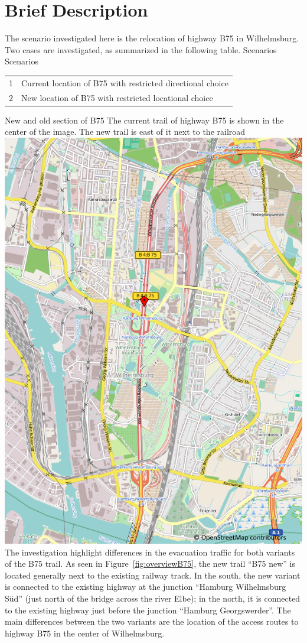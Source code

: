 \section{Brief Description}
The scenario investigated here is the relocation of highway B75 in Wilhelmsburg. Two cases are investigated, as summarized in the following table.
%
\createtable%
	{Scenarios}%
	{Scenarios}%
	{\label{table:b75scenarios}}%
	{%
	\begin{tabular}{|l | l|}
	\hline
	1 & Current location of B75 with restricted directional choice\\
	2 & New location of B75 with restricted locational choice\\
	\hline
\end{tabular}
}%
{}%
%
\createfigure%
	{New and old section of B75}%
	{The current trail of highway B75 is shown in the center of the image. The new trail is east of it next to the railroad}%
	{\label{fig:overviewB75}}%
	{\includegraphics[width=0.7\linewidth]{scenarios/figures/B75overview}}%
{}
%
The investigation highlight differences in the evacuation traffic for both variants of the B75 trail. As seen in Figure~\ref{fig:overviewB75}, the new trail ``B75 new'' is located generally next to the existing railway track. In the south, the new variant is connected to the existing highway at the junction ``Hamburg Wilhelmsburg S{\"u}d'' (just north of the bridge across the river Elbe); in the north, it is connected to the existing highway just before the junction ``Hamburg Georgswerder''. The main differences between the two variants are the location of the access routes to highway B75 in the center of Wilhelmsburg.

